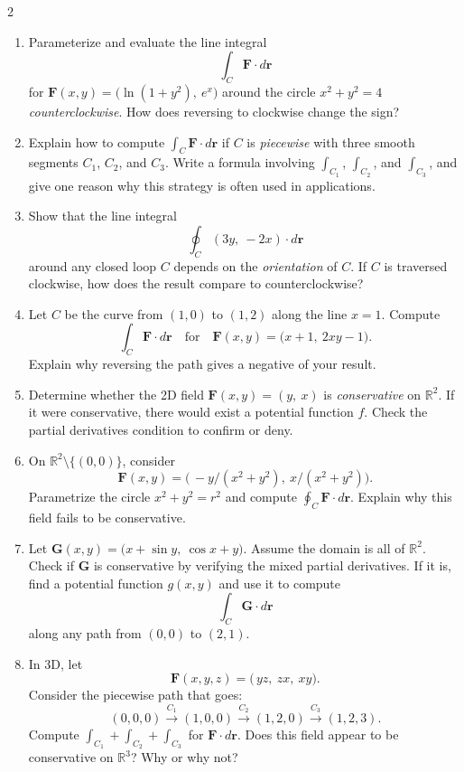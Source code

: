 \begin{multicols}{2}
\begin{enumerate}
\item \enspace
Parameterize and evaluate the line integral
\[
\int_C \mathbf{F}\cdot d\mathbf{r}
\]
for
\(\mathbf{F}(x,y) = \bigl(\ln(1+y^2),\ e^x\bigr)\)
around the circle \(x^2 + y^2 = 4\) \emph{counterclockwise}. How does reversing to clockwise change the sign?

\item 
Explain how to compute
\(\displaystyle \int_C \mathbf{F}\cdot d\mathbf{r}\)
if \(C\) is \emph{piecewise} with three smooth segments \(C_1\), \(C_2\), and \(C_3\). Write a formula involving \(\int_{C_1}\), \(\int_{C_2}\), and \(\int_{C_3}\), and give one reason why this strategy is often used in applications.

\item \enspace
Show that the line integral
\[
\oint_C (3y,\ -2x)\cdot d\mathbf{r}
\]
around any closed loop \(C\) depends on the \emph{orientation} of \(C\). If \(C\) is traversed clockwise, how does the result compare to counterclockwise?

\item 
Let \(C\) be the curve from \((1,0)\) to \((1,2)\) along the line \(x=1\). Compute
\[
\int_C \mathbf{F}\cdot d\mathbf{r}
\quad\text{for}\quad
\mathbf{F}(x,y) = \bigl(x+1,\ 2xy-1\bigr).
\]
Explain why reversing the path gives a negative of your result.

\item 
Determine whether the 2D field \(\mathbf{F}(x,y) = (y,\ x)\) is \emph{conservative} on \(\mathbb{R}^2\). If it were conservative, there would exist a potential function \(f\). Check the partial derivatives condition to confirm or deny.

\item \enspace
On \(\mathbb{R}^2\setminus\{(0,0)\}\), consider
\[
\mathbf{F}(x,y) = \bigl(\,-y/(x^2+y^2),\ x/(x^2+y^2)\bigr).
\]
Parametrize the circle \(x^2 + y^2 = r^2\) and compute
\(\displaystyle \oint_C \mathbf{F}\cdot d\mathbf{r}.\)
Explain why this field fails to be conservative.

\item \enspace
Let \(\mathbf{G}(x,y) = \bigl(x+\sin y,\ \cos x + y\bigr)\). Assume the domain is all of \(\mathbb{R}^2\). Check if \(\mathbf{G}\) is conservative by verifying the mixed partial derivatives. If it is, find a potential function \(g(x,y)\) and use it to compute
\[
\int_C \mathbf{G}\cdot d\mathbf{r}
\]
along any path from \((0,0)\) to \((2,1)\).

\item \enspace
In 3D, let
\[
\mathbf{F}(x,y,z) = \bigl(\,yz,\ zx,\ xy\bigr).
\]
Consider the piecewise path that goes:
\[
(0,0,0)\xrightarrow{C_1}(1,0,0)\xrightarrow{C_2}(1,2,0)\xrightarrow{C_3}(1,2,3).
\]
Compute \(\int_{C_1} + \int_{C_2} + \int_{C_3}\) for \(\mathbf{F}\cdot d\mathbf{r}\). Does this field appear to be conservative on \(\mathbb{R}^3\)? Why or why not?


\end{enumerate}
\end{multicols}
